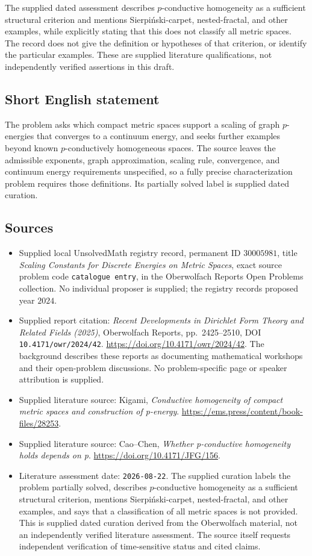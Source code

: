 \documentclass[11pt]{article}
\begin{document}
The supplied dated assessment describes \(p\)-conductive homogeneity as a sufficient structural criterion and mentions Sierpi\'nski-carpet, nested-fractal, and other examples, while explicitly stating that this does not classify all metric spaces. The record does not give the definition or hypotheses of that criterion, or identify the particular examples. These are supplied literature qualifications, not independently verified assertions in this draft.
\subsection{Short English statement}
The problem asks which compact metric spaces support a scaling of graph \(p\)-energies that converges to a continuum energy, and seeks further examples beyond known \(p\)-conductively homogeneous spaces. The source leaves the admissible exponents, graph approximation, scaling rule, convergence, and continuum energy requirements unspecified, so a fully precise characterization problem requires those definitions. Its partially solved label is supplied dated curation.
\subsection{Sources}
\begin{itemize}
\item Supplied local UnsolvedMath registry record, permanent ID \(30005981\), title \emph{Scaling Constants for Discrete Energies on Metric Spaces}, exact source problem code \texttt{catalogue entry}, in the Oberwolfach Reports Open Problems collection. No individual proposer is supplied; the registry records proposed year \(2024\).
\item Supplied report citation: \emph{Recent Developments in Dirichlet Form Theory and Related Fields (2025)}, Oberwolfach Reports, pp.~2425--2510, DOI \texttt{10.4171/owr/2024/42}. \url{https://doi.org/10.4171/owr/2024/42}. The background describes these reports as documenting mathematical workshops and their open-problem discussions. No problem-specific page or speaker attribution is supplied.
\item Supplied literature source: Kigami, \emph{Conductive homogeneity of compact metric spaces and construction of p-energy}. \url{https://ems.press/content/book-files/28253}.
\item Supplied literature source: Cao--Chen, \emph{Whether p-conductive homogeneity holds depends on p}. \url{https://doi.org/10.4171/JFG/156}.
\item Literature assessment date: \texttt{2026-08-22}. The supplied curation labels the problem partially solved, describes \(p\)-conductive homogeneity as a sufficient structural criterion, mentions Sierpi\'nski-carpet, nested-fractal, and other examples, and says that a classification of all metric spaces is not provided. This is supplied dated curation derived from the Oberwolfach material, not an independently verified literature assessment. The source itself requests independent verification of time-sensitive status and cited claims.
\end{itemize}
\end{document}
